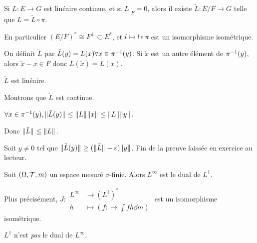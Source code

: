 \documentclass[10pt,a4paper,notitlepage ]{report}
\begin{document}
\begin{rem}
	Si $L:E\rightarrow G$ est linéaire continue, et si $L|_F=0$, alors il existe $\tilde L :E/F \rightarrow G$ telle que $L=\tilde L\circ \pi$.
	
	En particulier $(E/F)^* \cong F^\perp \subset E^*$, et $l\mapsto l\circ\pi$ est un isomorphisme isométrique.
	
	\begin{demo}
		On définit $\tilde L$ par $\tilde L(y)=L(x) \forall x \in \pi^{-1}(y)$. Si $\tilde x$ est un autre élément de $\pi^{-1}(y)$, alors $\tilde x - x \in F$ donc $L(\tilde x) = L(x)$.
	\end{demo}
	
	$\tilde L$ est linéaire.
	
	Montrons que $\tilde L$ est continue.
	
	$\forall x \in \pi^{-1}(y), \|\tilde L(y)\|_{} \le \|L\|_{}\|x\|_{} \le \|L\|_{} \|y\|_{}$.
	
	Donc $\|\tilde L\|_{} \le \|L\|_{}$.
	
	Soit $y\neq 0$ tel que $\|\tilde L(y)\|_{} \ge (\|\tilde L\|_{}-\varepsilon)\|y\|_{}$. Fin de la preuve laissée en exercice au lecteur.	
\end{rem}

\begin{theorem}
	Soit $(\Omega,\mathcal T,m)$ un espace mesuré $\sigma$-finie. Alors $L^\infty$ est le dual de $L^1$.
	
	Plus précisément, $J:\begin{aligned} L^\infty &\rightarrow (L^1)^* \\ h&\mapsto (f:\mapsto \int fh\dd m)\end{aligned}$ est un isomorphisme isométrique.
\end{theorem}
\begin{rem}
	$L^1$ n'est \emph{pas} le dual de $L^\infty$.
\end{rem}
\end{document}
